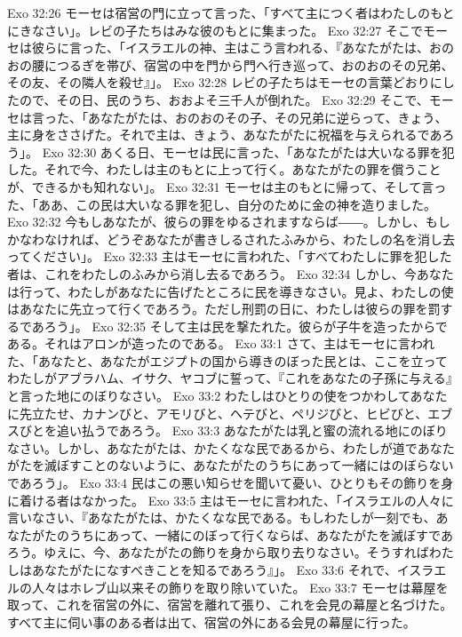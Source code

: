 Exo 32:26  モーセは宿営の門に立って言った、「すべて主につく者はわたしのもとにきなさい」。レビの子たちはみな彼のもとに集まった。
Exo 32:27  そこでモーセは彼らに言った、「イスラエルの神、主はこう言われる、『あなたがたは、おのおの腰につるぎを帯び、宿営の中を門から門へ行き巡って、おのおのその兄弟、その友、その隣人を殺せ』」。
Exo 32:28  レビの子たちはモーセの言葉どおりにしたので、その日、民のうち、おおよそ三千人が倒れた。
Exo 32:29  そこで、モーセは言った、「あなたがたは、おのおのその子、その兄弟に逆らって、きょう、主に身をささげた。それで主は、きょう、あなたがたに祝福を与えられるであろう」。
Exo 32:30  あくる日、モーセは民に言った、「あなたがたは大いなる罪を犯した。それで今、わたしは主のもとに上って行く。あなたがたの罪を償うことが、できるかも知れない」。
Exo 32:31  モーセは主のもとに帰って、そして言った、「ああ、この民は大いなる罪を犯し、自分のために金の神を造りました。
Exo 32:32  今もしあなたが、彼らの罪をゆるされますならば――。しかし、もしかなわなければ、どうぞあなたが書きしるされたふみから、わたしの名を消し去ってください」。
Exo 32:33  主はモーセに言われた、「すべてわたしに罪を犯した者は、これをわたしのふみから消し去るであろう。
Exo 32:34  しかし、今あなたは行って、わたしがあなたに告げたところに民を導きなさい。見よ、わたしの使はあなたに先立って行くであろう。ただし刑罰の日に、わたしは彼らの罪を罰するであろう」。
Exo 32:35  そして主は民を撃たれた。彼らが子牛を造ったからである。それはアロンが造ったのである。
Exo 33:1  さて、主はモーセに言われた、「あなたと、あなたがエジプトの国から導きのぼった民とは、ここを立ってわたしがアブラハム、イサク、ヤコブに誓って、『これをあなたの子孫に与える』と言った地にのぼりなさい。
Exo 33:2  わたしはひとりの使をつかわしてあなたに先立たせ、カナンびと、アモリびと、ヘテびと、ペリジびと、ヒビびと、エブスびとを追い払うであろう。
Exo 33:3  あなたがたは乳と蜜の流れる地にのぼりなさい。しかし、あなたがたは、かたくなな民であるから、わたしが道であなたがたを滅ぼすことのないように、あなたがたのうちにあって一緒にはのぼらないであろう」。
Exo 33:4  民はこの悪い知らせを聞いて憂い、ひとりもその飾りを身に着ける者はなかった。
Exo 33:5  主はモーセに言われた、「イスラエルの人々に言いなさい、『あなたがたは、かたくなな民である。もしわたしが一刻でも、あなたがたのうちにあって、一緒にのぼって行くならば、あなたがたを滅ぼすであろう。ゆえに、今、あなたがたの飾りを身から取り去りなさい。そうすればわたしはあなたがたになすべきことを知るであろう』」。
Exo 33:6  それで、イスラエルの人々はホレブ山以来その飾りを取り除いていた。
Exo 33:7  モーセは幕屋を取って、これを宿営の外に、宿営を離れて張り、これを会見の幕屋と名づけた。すべて主に伺い事のある者は出て、宿営の外にある会見の幕屋に行った。
